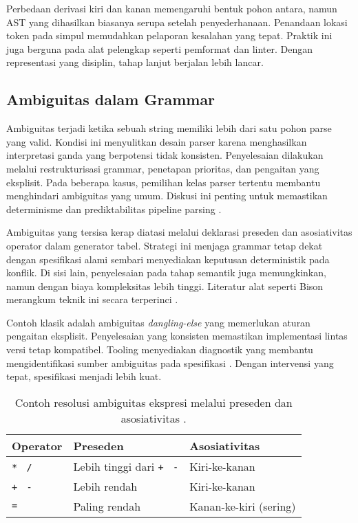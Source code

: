 \documentclass[../main.tex]{subfiles}
\begin{document}
Perbedaan derivasi kiri dan kanan memengaruhi bentuk pohon antara, namun AST yang dihasilkan biasanya serupa setelah penyederhanaan. Penandaan lokasi token pada simpul memudahkan pelaporan kesalahan yang tepat. Praktik ini juga berguna pada alat pelengkap seperti pemformat dan linter. Dengan representasi yang disiplin, tahap lanjut berjalan lebih lancar.

\subsection{Ambiguitas dalam Grammar}
Ambiguitas terjadi ketika sebuah string memiliki lebih dari satu pohon parse yang valid. Kondisi ini menyulitkan desain parser karena menghasilkan interpretasi ganda yang berpotensi tidak konsisten. Penyelesaian dilakukan melalui restrukturisasi grammar, penetapan prioritas, dan pengaitan yang eksplisit. Pada beberapa kasus, pemilihan kelas parser tertentu membantu menghindari ambiguitas yang umum. Diskusi ini penting untuk memastikan determinisme dan prediktabilitas pipeline parsing \citep{Mogensen2010}.

Ambiguitas yang tersisa kerap diatasi melalui deklarasi preseden dan asosiativitas operator dalam generator tabel. Strategi ini menjaga grammar tetap dekat dengan spesifikasi alami sembari menyediakan keputusan deterministik pada konflik. Di sisi lain, penyelesaian pada tahap semantik juga memungkinkan, namun dengan biaya kompleksitas lebih tinggi. Literatur alat seperti Bison merangkum teknik ini secara terperinci \citep{BisonManual}.

Contoh klasik adalah ambiguitas \emph{dangling-else} yang memerlukan aturan pengaitan eksplisit. Penyelesaian yang konsisten memastikan implementasi lintas versi tetap kompatibel. Tooling menyediakan diagnostik yang membantu mengidentifikasi sumber ambiguitas pada spesifikasi \citep{Mogensen2010}. Dengan intervensi yang tepat, spesifikasi menjadi lebih kuat.

\begin{table}[t]
  \centering
  \caption{Contoh resolusi ambiguitas ekspresi melalui preseden dan asosiativitas \citep{WikiOperatorPrecedence}.}
  \label{tab:precedence}
  \begin{tabular}{@{}lll@{}}
    \toprule
    Operator & Preseden & Asosiativitas \\
    \midrule
    \texttt{*} \, \texttt{/} & Lebih tinggi dari \texttt{+} \, \texttt{-} & Kiri-ke-kanan \\
    \texttt{+} \, \texttt{-} & Lebih rendah & Kiri-ke-kanan \\
    \texttt{=} & Paling rendah & Kanan-ke-kiri (sering) \\
    \bottomrule
  \end{tabular}
\end{table}
\end{document}
